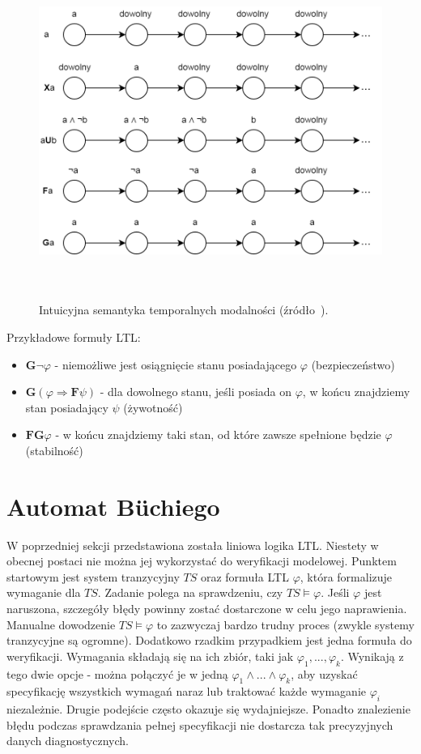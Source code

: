 \begin{figure}[h]
    \centering
    \includegraphics[height=11cm,keepaspectratio]{img/ltl_intuitive_semantics.png}
    \caption{Intuicyjna semantyka temporalnych modalności (źródło~\cite{Bai08}).}
    \label{fig:ltl_semantics}
\end{figure}

Przykładowe formuły LTL:
\begin{itemize}
\item $\mathbf{G}\neg\varphi$ - niemożliwe jest osiągnięcie stanu posiadającego $\varphi$ (bezpieczeństwo)
\item $\mathbf{G}(\varphi\Rightarrow\mathbf{F}\psi)$ - dla dowolnego stanu, jeśli posiada on $\varphi$, w końcu znajdziemy stan posiadający $\psi$ (żywotność)
\item $\mathbf{FG}\varphi$ - w końcu znajdziemy taki stan, od które zawsze spełnione będzie $\varphi$ (stabilność)
\end{itemize}


\section{Automat Büchiego}

W poprzedniej sekcji przedstawiona została liniowa logika LTL.
Niestety w obecnej postaci nie można jej wykorzystać do weryfikacji modelowej.
Punktem startowym jest system tranzycyjny $TS$ oraz formuła LTL $\varphi$, która formalizuje wymaganie dla $TS$.
Zadanie polega na sprawdzeniu, czy $TS \models \varphi$.
Jeśli $\varphi$ jest naruszona, szczegóły błędy powinny zostać dostarczone w celu jego naprawienia.
Manualne dowodzenie $TS \models \varphi$ to zazwyczaj bardzo trudny proces (zwykle systemy tranzycyjne są ogromne).
Dodatkowo rzadkim przypadkiem jest jedna formuła do weryfikacji.
Wymagania składają się na ich zbiór, taki jak $\varphi_1,...,\varphi_k$.
Wynikają z tego dwie opcje - można połączyć je w jedną $\varphi_1 \land ... \land \varphi_k$, aby uzyskać specyfikację wszystkich wymagań naraz lub traktować każde wymaganie $\varphi_i$ niezależnie.
Drugie podejście często okazuje się wydajniejsze.
Ponadto znalezienie błędu podczas sprawdzania pełnej specyfikacji nie dostarcza tak precyzyjnych danych diagnostycznych.

